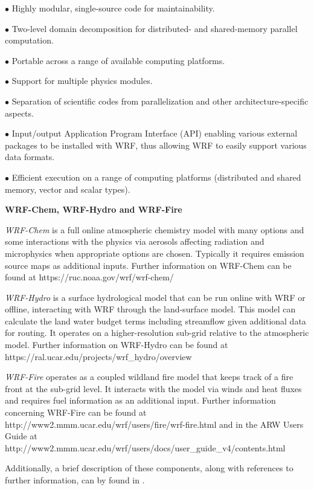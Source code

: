 \begin{description}
\setlength{\itemsep}{-5pt}
\item{$\bullet$} Highly modular, single-source code for maintainability.
%
\item{$\bullet$} Two-level domain decomposition for distributed- and 
shared-memory parallel computation.
%
\item{$\bullet$} Portable across a range of available computing platforms.
%
\item{$\bullet$} Support for multiple physics modules.
%
\item{$\bullet$}
Separation of scientific codes from parallelization and other 
architecture-specific aspects.
%
\item{$\bullet$}
Input/output Application Program Interface (API) enabling various external
packages to be installed with WRF, thus allowing WRF
to easily support various data formats.
%
\item{$\bullet$}
Efficient execution on a range of computing platforms
(distributed and shared memory, vector
and scalar types).
%
%
\end{description}

\vskip 12pt
{\noindent\bf WRF-Chem, WRF-Hydro and WRF-Fire}
\vskip 12pt

{\em WRF-Chem} is a full online atmospheric chemistry model with many options and some
interactions with the physics via aerosols affecting radiation and microphysics when appropriate
options are chosen. Typically it requires emission source maps as additional inputs.  Further information on WRF-Chem can be found at
https://ruc.noaa.gov/wrf/wrf-chem/

{\em WRF-Hydro} is a surface hydrological model that can be run online with WRF or offline,
interacting with WRF through the land-surface model. This model can calculate the land water
budget terms including streamflow given additional data for routing. It operates on a higher-resolution
sub-grid relative to the atmospheric model.  Further information on WRF-Hydro can be found at
https://ral.ucar.edu/projects/wrf\_hydro/overview

{\em WRF-Fire} operates as a coupled wildland fire model that keeps track of a fire front at the
sub-grid level. It interacts with the model via winds and heat fluxes and requires fuel information as
an additional input.  Further information concerning WRF-Fire can be found at 
http://www2.mmm.ucar.edu/wrf/users/fire/wrf-fire.html
and in the ARW Users Guide at
http://www2.mmm.ucar.edu/wrf/users/docs/user\_guide\_v4/contents.html



Additionally, a brief description of these components, along with references to further information, can by found in \citet{powers17}.